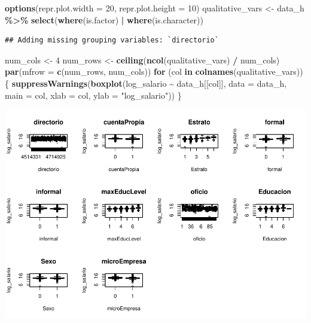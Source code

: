 \documentclass[
]{article}
\newenvironment{Shaded}{\begin{snugshade}}{\end{snugshade}}
\newcommand{\AttributeTok}[1]{\textcolor[rgb]{0.13,0.29,0.53}{#1}}
\newcommand{\ControlFlowTok}[1]{\textcolor[rgb]{0.13,0.29,0.53}{\textbf{#1}}}
\newcommand{\DecValTok}[1]{\textcolor[rgb]{0.00,0.00,0.81}{#1}}
\newcommand{\FunctionTok}[1]{\textcolor[rgb]{0.13,0.29,0.53}{\textbf{#1}}}
\newcommand{\NormalTok}[1]{#1}
\newcommand{\OtherTok}[1]{\textcolor[rgb]{0.56,0.35,0.01}{#1}}
\newcommand{\SpecialCharTok}[1]{\textcolor[rgb]{0.81,0.36,0.00}{\textbf{#1}}}
\newcommand{\StringTok}[1]{\textcolor[rgb]{0.31,0.60,0.02}{#1}}
\begin{document}
\begin{Shaded}
\begin{Highlighting}[]
\FunctionTok{options}\NormalTok{(}\AttributeTok{repr.plot.width =} \DecValTok{20}\NormalTok{, }\AttributeTok{repr.plot.height =} \DecValTok{10}\NormalTok{)}
\NormalTok{qualitative\_vars }\OtherTok{\textless{}{-}}\NormalTok{ data\_h }\SpecialCharTok{\%\textgreater{}\%} \FunctionTok{select}\NormalTok{(}\FunctionTok{where}\NormalTok{(is.factor) }\SpecialCharTok{|} \FunctionTok{where}\NormalTok{(is.character))}
\end{Highlighting}
\end{Shaded}

\begin{verbatim}
## Adding missing grouping variables: `directorio`
\end{verbatim}

\begin{Shaded}
\begin{Highlighting}[]
\NormalTok{num\_cols }\OtherTok{\textless{}{-}} \DecValTok{4}
\NormalTok{num\_rows }\OtherTok{\textless{}{-}} \FunctionTok{ceiling}\NormalTok{(}\FunctionTok{ncol}\NormalTok{(qualitative\_vars) }\SpecialCharTok{/}\NormalTok{ num\_cols)}
\FunctionTok{par}\NormalTok{(}\AttributeTok{mfrow =} \FunctionTok{c}\NormalTok{(num\_rows, num\_cols))}
\ControlFlowTok{for}\NormalTok{ (col }\ControlFlowTok{in} \FunctionTok{colnames}\NormalTok{(qualitative\_vars)) \{}
  \FunctionTok{suppressWarnings}\NormalTok{(}\FunctionTok{boxplot}\NormalTok{(log\_salario }\SpecialCharTok{\textasciitilde{}}\NormalTok{ data\_h[[col]], }\AttributeTok{data =}\NormalTok{ data\_h, }\AttributeTok{main =}\NormalTok{ col, }\AttributeTok{xlab =}\NormalTok{ col, }\AttributeTok{ylab =} \StringTok{"log\_salario"}\NormalTok{))}
\NormalTok{\}}
\end{Highlighting}
\end{Shaded}

\includegraphics{Taller-1_files/figure-latex/unnamed-chunk-15-1.pdf}
\end{document}
